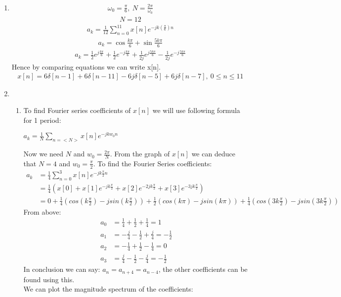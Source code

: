 \documentclass[10pt,a4paper, margin=1in]{article}
\begin{document}
\begin{enumerate}
\item %
\begin{align*}
     \omega_0 = \frac{\pi}{6}, \ N = \frac{2\pi}{\omega_0}
\end{align*}
\begin{align*}
    N = 12
\end{align*}
\begin{align*}
    a_k = \frac{1}{12} \sum_{n=0}^{11} x[n]e^{-jk(\frac{\pi}{6})n}
\end{align*}
\begin{align*}
    a_k = \cos{\frac{k\pi}{6}} + \sin{\frac{5k\pi}{6}}
\end{align*}
\begin{align*}
    a_k = \frac{1}{2}e^{j\frac{k\pi}{6}} + \frac{1}{2}e^{-j\frac{k\pi}{6}} + \frac{1}{2j}e^{j\frac{5k\pi}{6}} - \frac{1}{2j}e^{-j\frac{5k\pi}{6}}
\end{align*}
Hence by comparing equations we can write x[n].
\begin{align*}
    x[n] = 6\delta[n-1] + 6\delta[n-11] -6j\delta[n-5] +6j\delta[n-7], \ 0\leq n \leq 11
\end{align*}
\item %
    \begin{enumerate}
    \item 
    
    	To find Fourier series coefficients of $x[n]$ we will use following formula for 1 period:
		\begin{center}
		$a_k = \frac{1}{N}\sum_{n=<N>} x[n]e^{-jkw_0n}$ \\
		\end{center}
		Now we need $N$ and $w_0=\frac{2\pi}{N}$. From the graph of $x[n]$ we can deduce that $N=4$ and $w_0=\frac{\pi}{2}$. To find the Fourier Series coefficients:
		\begin{align*}
		a_k &= \frac{1}{4}\sum_{n=0}^{3} x[n]e^{-jk\frac{\pi}{2}n} \\
			&= \frac{1}{4}(x[0] + x[1]e^{-jk\frac{\pi}{2}} + x[2]e^{-2jk\frac{\pi}{2}} + x[3]e^{-3jk\frac{\pi}{2}}) \\
			&= 0 + \frac{1}{4}(cos(k\frac{\pi}{2}) - jsin(k\frac{\pi}{2})) + \frac{1}{2}(cos(k\pi) - jsin(k\pi)) + \frac{1}{4}(cos(3k\frac{\pi}{2}) - jsin(3k\frac{\pi}{2}))
		\end{align*}
		From above:
		\begin{align*}
		a_0 &= \frac{1}{4} + \frac{1}{2} + \frac{1}{4} = 1 \\
		a_1 &= -\frac{j}{4} - \frac{1}{2} + \frac{j}{4} = -\frac{1}{2} \\
		a_2 &= -\frac{1}{4} + \frac{1}{2} -\frac{1}{4} = 0 \\
		a_3 &= \frac{j}{4} - \frac{1}{2} -\frac{j}{4} = -\frac{1}{2}			
		\end{align*}
		In conclusion we can say: $a_n = a_{n+4} = a_{n-4}$, the other coefficients can be found using this. \\
		We can plot the magnitude spectrum of the coefficients: \\
    

\end{enumerate}
\end{enumerate}
\end{document}
